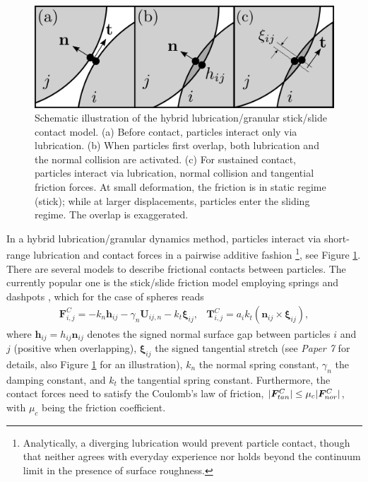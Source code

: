 \begin{figure}%
  \centering
  \includegraphics[width=0.9\columnwidth]{stick-slide.pdf}
  \caption{Schematic illustration of the hybrid lubrication/granular stick/slide contact model.
  (a) Before contact, particles interact only via lubrication.
  (b) When particles first overlap, both lubrication and the normal collision are activated.
  (c) For sustained contact, particles interact via lubrication, normal collision and tangential friction forces.
  At small deformation, the friction is in static regime (\ie stick); while at larger displacements, particles enter the sliding regime.
  The overlap is exaggerated.}
  \label{fig:stick-slide}
\end{figure}

In a hybrid lubrication/granular dynamics method, particles interact via short-range lubrication and contact forces in a pairwise additive fashion%
\footnote{Analytically, a diverging lubrication would prevent particle contact,
though that neither agrees with everyday experience nor holds beyond the continuum limit in the presence of surface roughness.},
see Figure \ref{fig:stick-slide}.
There are several models to describe frictional contacts between particles.
The currently popular one is the stick/slide friction model employing springs and dashpots \citep{Luding2008}, which for the case of spheres reads
\begin{subequations} \label{eq:hlcd-contact}
  \begin{equation} 
    \begin{aligned}
      {\bm F}^C_{i,j} = -k_n {\bm h}_{ij}  - \gamma_n \bm{U}_{ij,n} - k_t {\bm \xi}_{ij},
    \end{aligned}
    \label{col F}
  \end{equation}
  \begin{equation} 
    \begin{aligned}
      {\bm T}^C_{i,j} = a_{i} k_t ({\bm n}_{ij} \times {\bm \xi}_{ij}),
    \end{aligned}
  \end{equation}
\end{subequations}
where ${\bm h}_{ij}=h_{ij}{\bm n}_{ij}$ denotes the signed normal surface gap between particles $i$ and $j$ (positive when overlapping),
${\bm \xi}_{ij}$ the signed tangential stretch (see \emph{Paper 7} for details, also Figure \ref{fig:stick-slide} for an illustration),
$k_n$ the normal spring constant,
$\gamma_n$ the damping constant,
and $k_t$ the tangential spring constant.
Furthermore, the contact forces need to satisfy the Coulomb's law of friction, \ie $\lvert\bm{F}^C_{tan}\rvert \leq \mu_c\lvert\bm{F}^C_{nor}\rvert$, with $\mu_c$ being the friction coefficient. 


